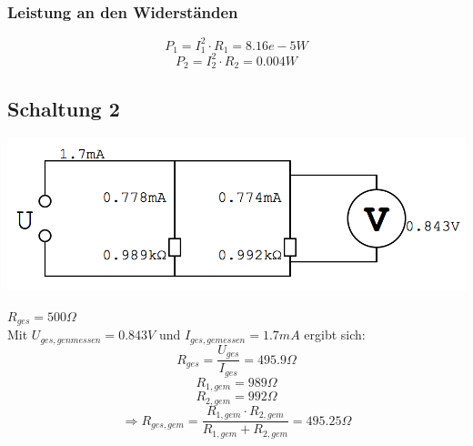 \documentclass[compress,11pt]{beamer}
\begin{document}
\begin{frame}
\subsubsection{Leistung an den Widerständen}
\begin{equation}
P_1 = I_1^2 \cdot R_1 = 8.16 e-5 W
\end{equation}
\begin{equation}
P_2 = I_2^2 \cdot R_2 = 0.004 W
\end{equation}
\end{frame}

\subsection{Schaltung 2}
\begin{frame}
\includegraphics[width=\textwidth]{images/22.png}
\end{frame}
\begin{frame}
$R_{ges} = 500 \Omega$ \\ Mit $U_{ges,genmessen} = 0.843 V$ und $I_{ges,gemessen} = 1.7 mA$ ergibt sich: 
\begin{equation}
R_{ges} = \frac{U_{ges}}{I_{ges}} = 495.9 \Omega
\end{equation}
\begin{equation}
R_{1,gem} = 989 \Omega 
\end{equation}
\begin{equation}
R_{2,gem} = 992 \Omega
\end{equation}
\begin{equation}
\Rightarrow R_{ges,gem} = \frac{R_{1,gem} \cdot R_{2,gem}}{R_{1,gem} + R_{2,gem}} = 495.25 \Omega
\end{equation}
\end{frame}
\end{document}
